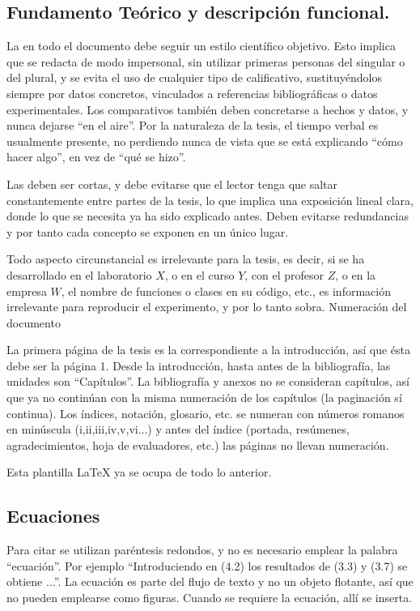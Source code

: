 \subsection{Fundamento Teórico y descripción funcional.}




La  en todo el documento debe seguir un estilo científico
objetivo. Esto implica que se redacta de modo impersonal, sin utilizar primeras
personas del singular o del plural, y se evita el uso de cualquier tipo de
calificativo, sustituyéndolos siempre por datos concretos, vinculados a
referencias bibliográficas o datos experimentales. Los comparativos también
deben concretarse a hechos y datos, y nunca dejarse ``en el aire''. Por la
naturaleza de la tesis, el tiempo verbal es usualmente presente, no perdiendo
nunca de vista que se está explicando ``cómo hacer algo'', en vez de ``qué se
hizo''.

Las  deben ser cortas, y debe evitarse que el lector tenga que saltar
constantemente entre partes de la tesis, lo que implica una exposición lineal
clara, donde lo que se necesita ya ha sido explicado antes. Deben evitarse
redundancias y por tanto cada concepto se exponen en un único lugar.

Todo aspecto circunstancial es irrelevante para la tesis, es decir, si se ha
desarrollado en el laboratorio $X$, o en el curso $Y$, con el profesor $Z$, o
en la empresa $W$, el nombre de funciones o clases en su código, etc., es
información irrelevante para reproducir el experimento, y por lo tanto sobra.
Numeración del documento

La primera página de la tesis es la correspondiente a la introducción, así que
ésta debe ser la página 1. Desde la introducción, hasta antes de la
bibliografía, las unidades son ``Capítulos''. La bibliografía y anexos no se
consideran capítulos, así que ya no continúan con la misma numeración de los
capítulos (la paginación sí continua). Los índices, notación, glosario, etc. se
numeran con números romanos en minúscula (i,ii,iii,iv,v,vi...) y antes del
índice (portada, resúmenes, agradecimientos, hoja de evaluadores, etc.) las
páginas no llevan numeración. 

Esta plantilla LaTeX ya se ocupa de todo lo anterior.

\subsection{Ecuaciones}

Para citar  se utilizan paréntesis redondos, y no es necesario
emplear la palabra ``ecuación''. Por ejemplo ``Introduciendo en (4.2) los
resultados de (3.3) y (3.7) se obtiene ...''. La ecuación es parte del flujo de
texto y no un objeto flotante, así que no pueden emplearse como figuras. Cuando
se requiere la ecuación, allí se inserta.  

